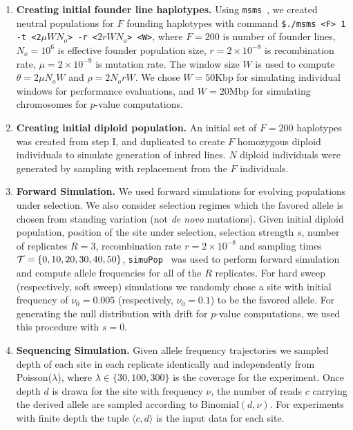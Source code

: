 \begin{enumerate}
\item {\bf Creating initial founder line haplotypes.} Using
  \texttt{msms}~\cite{ewing2010msms}, we created neutral populations
  for $F$ founding haplotypes with command \texttt{\$./msms <F> 1 -t
    <2$\mu WN_o$> -r <$2rWN_o$> <W>}, where $F=200$ is number of 
    founder
  lines, $N_o=10^6$ is effective founder population size,
  $r=2\times10^{-8}$ is recombination rate, $\mu=2\times 10^{-9}$ is
  mutation rate. The window size $W$ is used to compute $\theta=2\mu
  N_oW$ and $\rho=2N_orW$. We chose $W=50$Kbp for simulating
  individual windows for performance evaluations, and $W=20$Mbp for
  simulating \dmel chromosomes for $p$-value computations.
  
\item{\bf Creating initial diploid population.} An initial set of
  $F=200$ haplotypes was created from step I, and duplicated to create
  $F$ homozygous diploid individuals to simulate generation of inbred
  lines. $N$ diploid individuals were generated by sampling with
  replacement from the $F$ individuals.

\item{\bf Forward Simulation.} We used forward simulations for
  evolving populations under selection. We also consider selection
  regimes which the favored allele is chosen from standing variation
  (not \emph{de novo} mutations). Given initial diploid population,
  position of the site under selection, selection strength $s$, number
  of replicates $R=3$, recombination rate $r=2\times10^{-8}$ and
  sampling times ${\cal T}=\{0,10,20,30,40,50\}$,
  \texttt{simuPop}~\cite{peng2005simupop} was used to perform forward
  simulation and compute allele frequencies for all of the $R$
  replicates.  For hard sweep (respectively, soft sweep) simulations
  we randomly chose a site with initial frequency of $\nu_0=0.005$
  (respectively, $\nu_0=0.1$) to be the favored allele. For generating
  the null distribution with drift for $p$-value computations, we used
  this procedure with $s=0$.

\item{\bf Sequencing Simulation.} Given allele frequency trajectories
  we sampled depth of each site in each replicate identically and
  independently from Poisson($\lambda$), where $\lambda \in
  \{30,100,300\}$ is the coverage for the experiment. Once depth $d$
  is drawn for the site with frequency $\nu$, the number of reads $c$
  carrying the derived allele are sampled according to
  Binomial$(d,\nu)$. For experiments with finite depth the tuple
  $\langle c,d\rangle$ is the input data for each site.
\end{enumerate}
